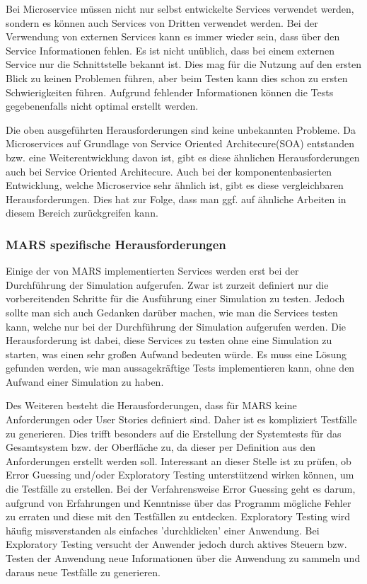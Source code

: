 \documentclass{llncs}
\begin{document}
Bei Microservice müssen nicht nur selbst entwickelte Services verwendet werden, sondern es können auch Services von Dritten verwendet werden. Bei der Verwendung von externen Services kann es immer wieder sein, dass über den Service Informationen fehlen. Es ist nicht unüblich, dass bei einem externen Service nur die Schnittstelle bekannt ist. Dies mag für die Nutzung auf den ersten Blick zu keinen Problemen führen, aber beim Testen kann dies schon zu ersten Schwierigkeiten führen. Aufgrund fehlender Informationen können die Tests gegebenenfalls nicht optimal erstellt werden.

Die oben ausgeführten Herausforderungen sind keine unbekannten Probleme. Da Microservices auf Grundlage von Service Oriented Architecure(SOA) entstanden bzw. eine Weiterentwicklung davon ist, gibt es diese ähnlichen Herausforderungen auch bei Service Oriented Architecure. Auch bei der komponentenbasierten Entwicklung, welche Microservice sehr ähnlich ist, gibt es diese vergleichbaren Herausforderungen. Dies hat zur Folge, dass man ggf. auf ähnliche Arbeiten in diesem Bereich zurückgreifen kann\cite{savchenko2015}.

\subsubsection{MARS spezifische Herausforderungen}
Einige der von MARS implementierten Services werden erst bei der Durchführung der Simulation aufgerufen. Zwar ist zurzeit definiert nur die vorbereitenden Schritte für die Ausführung einer Simulation zu testen. Jedoch sollte man sich auch Gedanken darüber machen, wie man die Services testen kann, welche nur bei der Durchführung der Simulation aufgerufen werden. Die Herausforderung ist dabei, diese Services zu testen ohne eine Simulation zu starten, was einen sehr großen Aufwand bedeuten würde. Es muss eine Lösung gefunden werden, wie man aussagekräftige Tests implementieren kann, ohne den Aufwand einer Simulation zu haben.

Des Weiteren besteht die Herausforderungen, dass für MARS keine Anforderungen oder User Stories definiert sind. Daher ist es kompliziert Testfälle zu generieren. Dies trifft besonders auf die Erstellung der Systemtests für das Gesamtsystem bzw. der Oberfläche  zu, da dieser per Definition aus den Anforderungen erstellt werden soll. Interessant an dieser Stelle ist zu prüfen, ob  Error Guessing \cite{homes2013fundamentals} und/oder Exploratory Testing \cite{bach2003exploratory} unterstützend wirken können, um die Testfälle zu erstellen. Bei der Verfahrensweise Error Guessing geht es darum, aufgrund von Erfahrungen und Kenntnisse über das Programm mögliche Fehler zu erraten und diese mit den Testfällen zu entdecken. Exploratory Testing wird häufig missverstanden als einfaches 'durchklicken' einer Anwendung. Bei Exploratory Testing versucht der Anwender jedoch durch aktives Steuern bzw. Testen der Anwendung neue Informationen über die Anwendung zu sammeln und daraus neue Testfälle zu generieren. 
\end{document}
